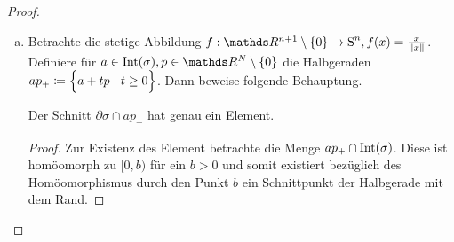 \begin{Satz}
\begin{proof}
\begin{enumerate}[(a):]

      \item Betrachte die stetige Abbildung
        $f : \R^{n+1} \setminus \sset{0} \rightarrow \Sp^{n}, f(x) =
        \frac{x}{\nn[x]}$.
        Definiere für
        $a \in \Int(\sigma), p \in \R^N \setminus \{ 0 \}$ die
        Halbgeraden $ap_+ \coloneqq \left\{  a + tp \; \Big| \;  t \geq 0 \right\}$. Dann
        beweise folgende Behauptung.
      \begin{Beh}
        Der Schnitt $\partial\sigma \cap ap_+$ hat genau ein Element.
        \begin{proof}
          Zur Existenz des Element betrachte die Menge
          $ap_+ \cap \operatorname{Int}(\sigma)$.  Diese ist homöomorph zu $[0,b)$
          für ein $b>0$ und somit existiert bezüglich des
          Homöomorphismus durch den Punkt $b$ ein Schnittpunkt der
          Halbgerade mit dem Rand.
          

\end{proof}
\end{Beh}
\end{enumerate}
\end{proof}
\end{Satz}
